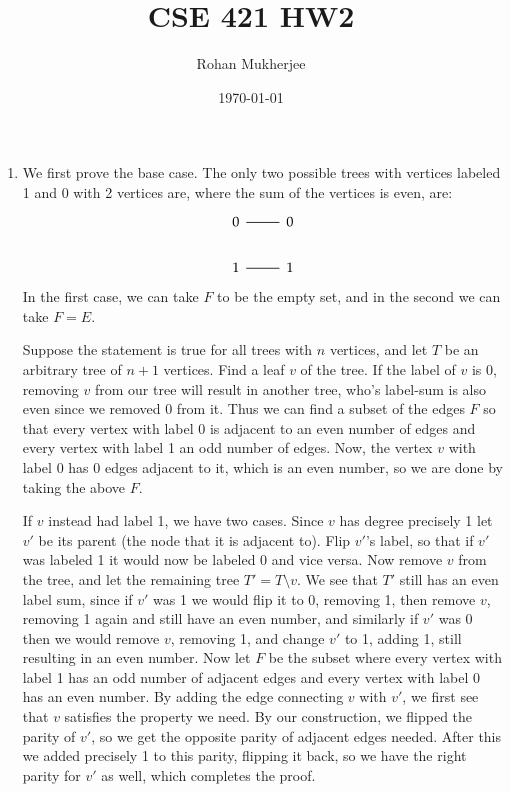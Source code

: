 \documentclass[12pt]{article}
\title{CSE 421 HW2}
\date{\today}
\author{Rohan Mukherjee}
\theoremstyle{definitionstyle}
\begin{document}
    \maketitle
    \begin{enumerate}[leftmargin=\labelsep]
        \item We first prove the base case. The only two possible trees with vertices labeled 1 and 0 with 2 vertices are, where the sum of the vertices is even, are:
        \[\begin{tikzcd}
            0 & 0 \\
            1 & 1
            \arrow[no head, from=1-1, to=1-2]
            \arrow[no head, from=2-1, to=2-2]
        \end{tikzcd}\]
        In the first case, we can take $F$ to be the empty set, and in the second we can take $F = E$.

        Suppose the statement is true for all trees with $n$ vertices, and let $T$ be an arbitrary tree of $n+1$ vertices. Find a leaf $v$ of the tree. If the label of $v$ is 0, removing $v$ from our tree will result in another tree, who's label-sum is also even since we removed 0 from it. Thus we can find a subset of the edges $F$ so that every vertex with label 0 is adjacent to an even number of edges and every vertex with label 1 an odd number of edges. Now, the vertex $v$ with label 0 has 0 edges adjacent to it, which is an even number, so we are done by taking the above $F$.

        If $v$ instead had label 1, we have two cases. Since $v$ has degree precisely 1 let $v'$ be its parent (the node that it is adjacent to). Flip $v'$'s label, so that if $v'$ was labeled 1 it would now be labeled 0 and vice versa. Now remove $v$ from the tree, and let the remaining tree $T' = T \setminus v$. We see that $T'$ still has an even label sum, since if $v'$ was 1 we would flip it to 0, removing 1, then remove $v$, removing 1 again and still have an even number, and similarly if $v'$ was 0 then we would remove $v$, removing 1, and change $v'$ to 1, adding 1, still resulting in an even number. Now let $F$ be the subset where every vertex with label 1 has an odd number of adjacent edges and every vertex with label 0 has an even number. By adding the edge connecting $v$ with $v'$, we first see that $v$ satisfies the property we need. By our construction, we flipped the parity of $v'$, so we get the opposite parity of adjacent edges needed. After this we added precisely 1 to this parity, flipping it back, so we have the right parity for $v'$ as well, which completes the proof.


\end{enumerate}
\end{document}

